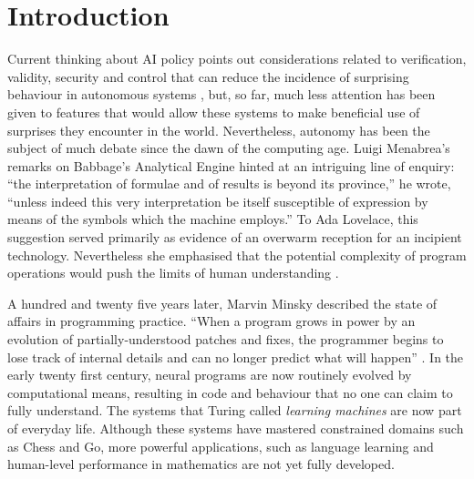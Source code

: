 \ifdraft{\tableofcontents
\clearpage
}{}

\section{Introduction} \label{sec:why-this-matters}
Current thinking about AI policy points out considerations related to verification, validity, security and control that can reduce the incidence of surprising behaviour in autonomous systems \cite{research-priorities}, but, so far, much less attention has been given to features that would allow these systems to make beneficial use of surprises they encounter in the world. 
%
Nevertheless, autonomy has been the subject of much debate since the dawn of the computing age.  Luigi Menabrea's \cite[p.~689]{menabrea1842sketch} remarks on Babbage's Analytical Engine hinted at an intriguing line of enquiry: ``the interpretation of formulae and of results is beyond its province,'' he wrote, ``unless indeed this very interpretation be itself susceptible of expression by means of the symbols which the machine employs.''  To Ada Lovelace, this suggestion served primarily as evidence of an overwarm reception for an incipient technology.  Nevertheless she emphasised that the potential complexity of program operations would push the limits of human understanding \cite[p.~710]{lovelace}.

A hundred and twenty five years later, Marvin Minsky described the state of affairs in programming practice.  ``When a program grows in power by an evolution of partially-understood patches and fixes, the programmer begins to lose track of internal details and can no longer predict what will happen'' \cite{minsky1967programming}.
In the early twenty first century, neural programs are now routinely evolved by computational means, resulting in code and behaviour that no one can claim to fully understand.  The systems that Turing called \emph{learning machines} \cite{turing1950mind} are now part of everyday life.  Although these systems have mastered constrained domains such as Chess and Go, more powerful applications, such as language learning and human-level performance in mathematics \cite{turing1948intelligentreport} are not yet fully developed.     

